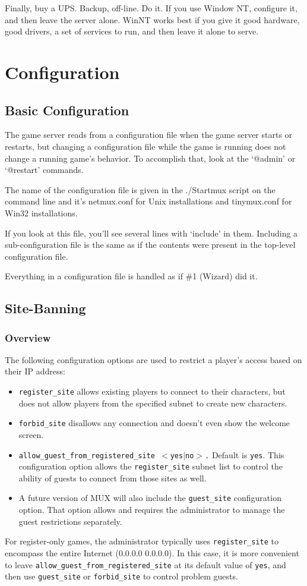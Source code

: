 \documentclass[10pt,letterpaper]{book}
\begin{document}
Finally, buy a UPS. Backup, off-line. Do it. If you use Window NT, configure
it, and then leave the server alone. WinNT works best if you give it good
hardware, good drivers, a set of services to run, and then leave it alone
to serve.
\chapter{Configuration}
\section{Basic Configuration}
The game server reads from a configuration file when the game server starts or
restarts, but changing a configuration file while the game is running does not
change a running game's behavior. To accomplish that, look at the `@admin' or
`@restart' commands.

The name of the configuration file is given in the ./Startmux script on the
command line and it's netmux.conf for Unix installations and tinymux.conf for
Win32 installations.

If you look at this file, you'll see several lines with `include' in them.
Including a sub-configuration file is the same as if the contents were
present in the top-level configuration file.

Everything in a configuration file is handled as if \#1 (Wizard) did it.
\section{Site-Banning}
\subsection{Overview}
The following configuration options are used to restrict a player's access
based on their IP address:
\begin{itemize}
\item
\texttt{register\_site} allows existing players to connect to their
characters, but does not allow players from the specified subnet to create
new characters.
\item
\texttt{forbid\_site} disallows any connection and doesn't even show the
welcome screen.
\item
\texttt{allow\_guest\_from\_registered\_site $<$yes$|$no$>$.}  Default is
\texttt{yes}. This configuration option allows the \texttt{register\_site}
subnet list to control the ability of guests to connect from those sites as
well.
\item A future version of MUX will also include the \texttt{guest\_site}
configuration option. That option allows and requires the administrator to
manage the guest restrictions separately.
\end{itemize}
For register-only games, the administrator typically uses
\texttt{register\_site} to encompass the entire Internet (0.0.0.0 0.0.0.0).
In this case, it is more convenient to leave
\texttt{allow\_guest\_from\_registered\_site} at its default value of
\texttt{yes}, and then use \texttt{guest\_site} or \texttt{forbid\_site} to
control problem guests.
\end{document}
